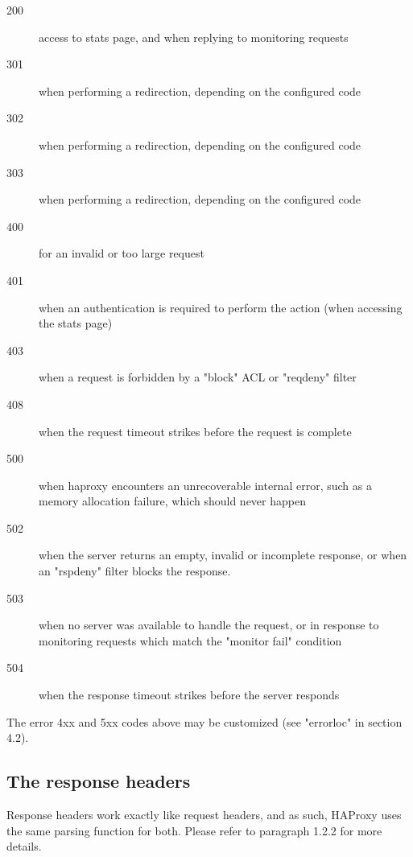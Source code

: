 \begin{description}
\item[200] access to stats page, and when replying to monitoring requests
\item[301] when performing a redirection, depending on the configured code
\item[302] when performing a redirection, depending on the configured code
\item[303] when performing a redirection, depending on the configured code
\item[400] for an invalid or too large request
\item[401] when an authentication is required to perform the action (when
        accessing the stats page)
\item[403] when a request is forbidden by a "block" ACL or "reqdeny" filter
\item[408] when the request timeout strikes before the request is complete
\item[500] when haproxy encounters an unrecoverable internal error, such as a
        memory allocation failure, which should never happen
\item[502] when the server returns an empty, invalid or incomplete response, or
        when an "rspdeny" filter blocks the response.
\item[503] when no server was available to handle the request, or in response to
        monitoring requests which match the "monitor fail" condition
\item[504] when the response timeout strikes before the server responds
\end{description}

The error 4xx and 5xx codes above may be customized (see "errorloc" in section
4.2).

\subsection{The response headers}
Response headers work exactly like request headers, and as such, HAProxy uses
the same parsing function for both. Please refer to paragraph 1.2.2 for more
details.
